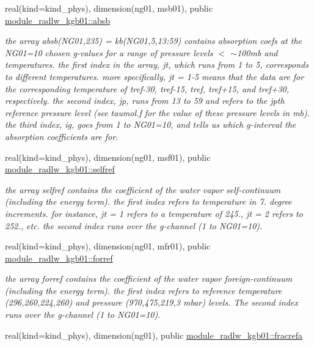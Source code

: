 \begin{DoxyCompactItemize}
real(kind=kind\+\_\+phys), dimension(ng01, msb01), public \hyperlink{group__module__radlw__kgbnn_gabdaefe1c38d8bfcac5ef9b878fac77cb}{module\+\_\+radlw\+\_\+kgb01\+::absb}
\begin{DoxyCompactList}\small\item\em the array absb(\+N\+G01,235) = kb(\+N\+G01,5,13\+:59) contains absorption coefs at the N\+G01=10 chosen g-\/values for a range of pressure levels $<$ $\sim$100mb and temperatures. the first index in the array, jt, which runs from 1 to 5, corresponds to different temperatures. more specifically, jt = 1-\/5 means that the data are for the corresponding temperature of tref-\/30, tref-\/15, tref, tref+15, and tref+30, respectively. the second index, jp, runs from 13 to 59 and refers to the jpth reference pressure level (see taumol.\+f for the value of these pressure levels in mb). the third index, ig, goes from 1 to N\+G01=10, and tells us which g-\/interval the absorption coefficients are for. \end{DoxyCompactList}\item 
real(kind=kind\+\_\+phys), dimension(ng01, msf01), public \hyperlink{group__module__radlw__kgbnn_ga14c7cc68b26c0ab1fdfda6faa2d485d5}{module\+\_\+radlw\+\_\+kgb01\+::selfref}
\begin{DoxyCompactList}\small\item\em the array selfref contains the coefficient of the water vapor self-\/continuum (including the energy term). the first index refers to temperature in 7. degree increments. for instance, jt = 1 refers to a temperature of 245., jt = 2 refers to 252., etc. the second index runs over the g-\/channel (1 to N\+G01=10). \end{DoxyCompactList}\item 
real(kind=kind\+\_\+phys), dimension(ng01, mfr01), public \hyperlink{group__module__radlw__kgbnn_gacd70a32f88808dc40c39edee5b76adbe}{module\+\_\+radlw\+\_\+kgb01\+::forref}
\begin{DoxyCompactList}\small\item\em the array forref contains the coefficient of the water vapor foreign-\/continuum (including the energy term). the first index refers to reference temperature (296,260,224,260) and pressure (970,475,219,3 mbar) levels. The second index runs over the g-\/channel (1 to N\+G01=10). \end{DoxyCompactList}\item 
real(kind=kind\+\_\+phys), dimension(ng01), public \hyperlink{group__module__radlw__kgbnn_ga0bca660247ac37483cd55c6936056631}{module\+\_\+radlw\+\_\+kgb01\+::fracrefa}

\end{DoxyCompactItemize}
